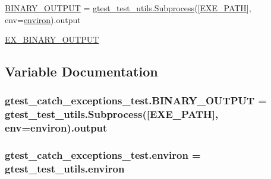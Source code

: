 \begin{DoxyCompactItemize}
\item 
\hyperlink{namespacegtest__catch__exceptions__test_a27d8da05609f357df39614cd41516993}{B\+I\+N\+A\+R\+Y\+\_\+\+O\+U\+T\+P\+UT} = \hyperlink{classgtest__test__utils_1_1Subprocess}{gtest\+\_\+test\+\_\+utils.\+Subprocess}(\mbox{[}\hyperlink{namespacegtest__catch__exceptions__test_a164e7815d55b13a811ce60e2e6f9448d}{E\+X\+E\+\_\+\+P\+A\+TH}\mbox{]}, env=\hyperlink{namespacegtest__catch__exceptions__test_ae51b794c28e667016c180f1b3fc85292}{environ}).output
\item 
\hyperlink{namespacegtest__catch__exceptions__test_a012f2b0e05fd56aa6817595da940c891}{E\+X\+\_\+\+B\+I\+N\+A\+R\+Y\+\_\+\+O\+U\+T\+P\+UT}
\end{DoxyCompactItemize}


\subsection{Variable Documentation}
\subsubsection[{\texorpdfstring{B\+I\+N\+A\+R\+Y\+\_\+\+O\+U\+T\+P\+UT}{BINARY_OUTPUT}}]{\setlength{\rightskip}{0pt plus 5cm}gtest\+\_\+catch\+\_\+exceptions\+\_\+test.\+B\+I\+N\+A\+R\+Y\+\_\+\+O\+U\+T\+P\+UT = {\bf gtest\+\_\+test\+\_\+utils.\+Subprocess}(\mbox{[}{\bf E\+X\+E\+\_\+\+P\+A\+TH}\mbox{]}, env={\bf environ}).output}\hypertarget{namespacegtest__catch__exceptions__test_a27d8da05609f357df39614cd41516993}{}\label{namespacegtest__catch__exceptions__test_a27d8da05609f357df39614cd41516993}
\subsubsection[{\texorpdfstring{environ}{environ}}]{\setlength{\rightskip}{0pt plus 5cm}gtest\+\_\+catch\+\_\+exceptions\+\_\+test.\+environ = gtest\+\_\+test\+\_\+utils.\+environ}\hypertarget{namespacegtest__catch__exceptions__test_ae51b794c28e667016c180f1b3fc85292}{}\label{namespacegtest__catch__exceptions__test_ae51b794c28e667016c180f1b3fc85292}
